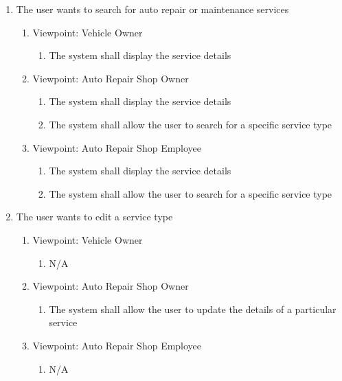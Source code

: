 \documentclass[12pt]{article}
\begin{document}
\begin{enumerate}[resume*=business_events]
	\item The user wants to search for auto repair or maintenance services
	      \begin{enumerate}[VP\arabic*.]
		      \item Viewpoint: Vehicle Owner
		            \begin{enumerate}
			            \item The system shall display the service details
		            \end{enumerate}
		      \item Viewpoint: Auto Repair Shop Owner
		            \begin{enumerate}
			            \item The system shall display the service details
			            \item The system shall allow the user to search for a specific service type
		            \end{enumerate}
		      \item Viewpoint: Auto Repair Shop Employee
		            \begin{enumerate}
			            \item The system shall display the service details
			            \item The system shall allow the user to search for a specific service type
		            \end{enumerate}
	      \end{enumerate}

	\item The user wants to edit a service type
	      \begin{enumerate}[VP\arabic*.]
		      \item Viewpoint: Vehicle Owner
		            \begin{enumerate}
			            \item[] N/A
		            \end{enumerate}
		      \item Viewpoint: Auto Repair Shop Owner
		            \begin{enumerate}
			            \item The system shall allow the user to update the details of a particular service
		            \end{enumerate}
		      \item Viewpoint: Auto Repair Shop Employee
		            \begin{enumerate}
			            \item[] N/A
		            \end{enumerate}
	      \end{enumerate}


\end{enumerate}
\end{document}
